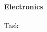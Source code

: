\documentclass{article}
\begin{document}
	\paragraph{Electronics}
	\begin{CheckList}{Task}
	\end{CheckList}
\end{document}
